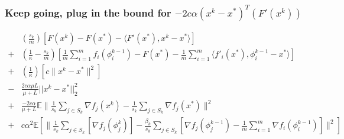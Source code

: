 \documentclass[11pt]{article}
\begin{document}
 
\subsubsection{Keep going, plug in the bound for  $-2c \alpha  (x^k - x^* )^T ( F'(x^k))$}
\begin{align*}
	& \left( \frac{s_k}{m}  \right) \left[   F(x^k) - F(x^*) -  \langle F'(x^*), x^k - x^*\rangle \right] \\
	+& \left( \frac{1}{\kappa} - \frac{s_k}{m}\right) \left[ \frac{1}{m}\sum_{i =1}^{m}  f_i(\phi_i^{k-1})   - F(x^*)  -\frac{1}{m}\sum_{i =1}^{m}   \langle f'_i(x^*), \phi_i^{k-1} - x^*\rangle \right] \\
	+& \left( \frac{1}{\kappa} \right) \left[ c \|x^k - x^* \|^2 \right] \\
	-&\frac{ 2c \alpha \mu L}{\mu+L}||x^k-x^*||_2^2 \\
	+& \frac{ -2c \alpha }{\mu+L}\mathbb{E} \| \frac{1}{s_k} \sum_{j \in S_k}   \nabla f_j(x^k) -\frac{1}{s_k} \sum_{j \in S_k}   \nabla f_j(x^*) \|^2 \\
	+&c  \alpha^2 \mathbb{E} \left[  \|\frac{1}{s_k} \sum_{j \in S_k} \left[  \nabla f_j(\phi_j^{k}) \right]- \frac{ \beta_k }{s_k} \sum_{j \in S_k} \left[  \nabla f_j(\phi^{k-1}_j) - \frac{1}{m} \sum_{i = 1}^{m }  \nabla f_i (\phi_i^{k-1}) \right]  \|^2 \right]  \\
\end{align*}
 
\end{document}
